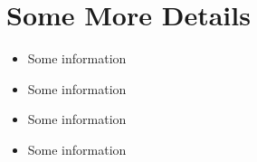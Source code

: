 \vspace{-0.8cm}
\section{Some More Details}

\begin{itemize}[noitemsep,nolistsep]
\item Some information
\item Some information
\item Some information
\item Some information
\end{itemize}


